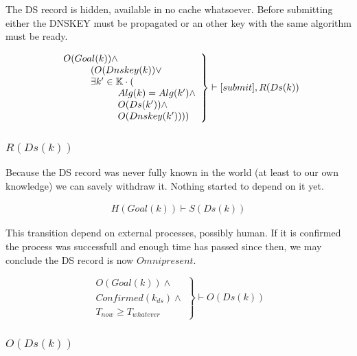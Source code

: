 \documentclass[twoside,english, a4paper]{article}
\newcommand{\mathbox}[1]{#1}
\begin{document}
	The DS record is hidden, available in no cache whatsoever.
	Before submitting either the DNSKEY must be propagated or an other 
	key with the same algorithm must be ready.
	
	\begin{equation}
		\left.
		\begin{array}{l}
			O(Goal(k)) \wedge \\
\hskip 1cm		(O(Dnskey(k)) \vee \\
\hskip 1cm		\exists k' \in \mathbb{K} \cdot ( \\
\hskip 2cm			Alg(k)=Alg(k') \wedge \\
\hskip 2cm			O(Ds(k')) \wedge \\
\hskip 2cm			O(Dnskey(k'))))
		\end{array}
		\right\}\vdash [submit], R(Ds(k)) 
	\end{equation}

\subsubsection{$R(Ds(k))$}

\mathbox{
	
	Because the DS record was never fully known in the world (at 
	least to our own knowledge) we can savely withdraw it. Nothing 
	started to depend on it yet.
	
	\begin{equation}
		\begin{split}
			H(Goal(k)) \vdash S(Ds(k))
		\end{split}
	\end{equation}

	This transition depend on external processes, possibly human. If it 
	is confirmed the process was successfull and enough time has passed
	since then, we may conclude the DS record is now $Omnipresent$.
	
	\begin{equation}
		\left.
		\begin{array}{l}
			O(Goal(k)) \wedge \\
			Confirmed(k_{ds}) \wedge \\
			T_{now} \geq T_{whatever}
		\end{array}
		\right\}\vdash O(Ds(k))
	\end{equation}
}

\subsubsection{$O(Ds(k))$}
\end{document}
